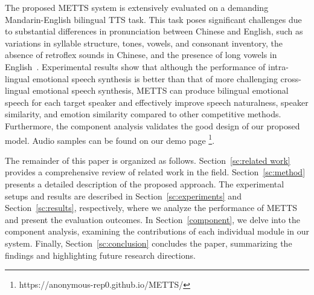 \documentclass[journal,comsoc]{IEEEtran}
\begin{document}
The proposed METTS system is extensively evaluated on a demanding Mandarin-English bilingual TTS task. This task poses significant challenges due to substantial differences in pronunciation between Chinese and English, such as variations in syllable structure, tones, vowels, and consonant inventory, the absence of retroflex sounds in Chinese, and the presence of long vowels in English~\cite{han2013pronunciation,li2016contrastive}. Experimental results show that although the performance of intra-lingual emotional speech synthesis is better than that of more challenging cross-lingual emotional speech synthesis, METTS can produce bilingual emotional speech for each target speaker and effectively improve speech naturalness, speaker
similarity, and emotion similarity compared to other competitive methods. Furthermore, the component analysis validates the good design of our proposed model. Audio samples can be found on our demo page \footnote{https://anonymous-rep0.github.io/METTS/}.


The remainder of this paper is organized as follows. Section~\ref{sc:related work} provides a comprehensive review of related work in the field. Section~\ref{sc:method} presents a detailed description of the proposed approach. The experimental setups and results are described in Section~\ref{sc:experiments} and Section~\ref{sc:results}, respectively, where we analyze the performance of METTS and present the evaluation outcomes. In Section~\ref{component}, we delve into the component analysis, examining the contributions of each individual module in our system. Finally, Section~\ref{sc:conclusion} concludes the paper, summarizing the findings and highlighting future research directions.
\end{document}
